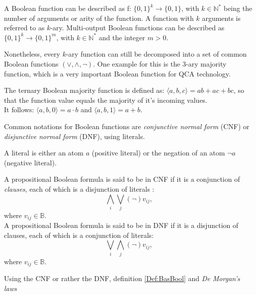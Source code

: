\begin{definition}
	A Boolean function can be described as f: $\{0, 1\}^k \to \{0, 1\}$, with $k \in \mathbb{N}^*$ being the number of arguments or arity of the function. A function with $k$ arguments is referred to as $k$-ary. Multi-output Boolean functions can be described as $\{0, 1\}^k \to \{0, 1\}^m$, with $k \in \mathbb{N}^*$ and the integer $m > 0$.
\end{definition}

Nonetheless, every $k$-ary function can still be decomposed into a set of common Boolean functions $(\vee, \wedge, \neg )$. One example for this is the 3-ary majority function, which is a very important Boolean function for QCA technology.

\begin{definition}\label{Def:majf}
	The ternary Boolean majority function is defined as: $\langle a, b, c \rangle = ab + ac + bc$, so that the function value equals the majority of it's incoming values.\\
	It follows: $\langle a, b, 0 \rangle = a \cdot b$ and $\langle a, b, 1 \rangle = a + b$.
\end{definition}

Common notations for Boolean functions are \textit{conjunctive normal form} (CNF) or \textit{disjunctive normal form} (DNF), using literals.

\begin{definition}
	A literal is either an atom $a$ (positive literal) or the negation of an atom $\neg a$ (negative literal).
\end{definition}

\begin{definition}
	A propositional Boolean formula is said to be in CNF if it is a conjunction of \textit{clauses}, each of which is a disjunction of literals \cite{CNF}:\\
	\[\displaystyle\bigwedge_{i} \displaystyle\bigvee_{j} (\neg) v_{ij}, \]
	where $v_{ij} \in \mathbb{B}$.\\
	A propositional Boolean formula is said to be in DNF if it is a disjunction of clauses, each of which is a conjunction of literals:\\
	\[ \displaystyle\bigvee_{i} \displaystyle\bigwedge_{j} (\neg) v_{ij}, \]
	where $v_{ij} \in \mathbb{B}$.
	
\end{definition}

Using the CNF or rather the DNF, definition \ref{Def:BasBool} and \textit{De Morgan's laws} \cite{DeMorgans_laws}


